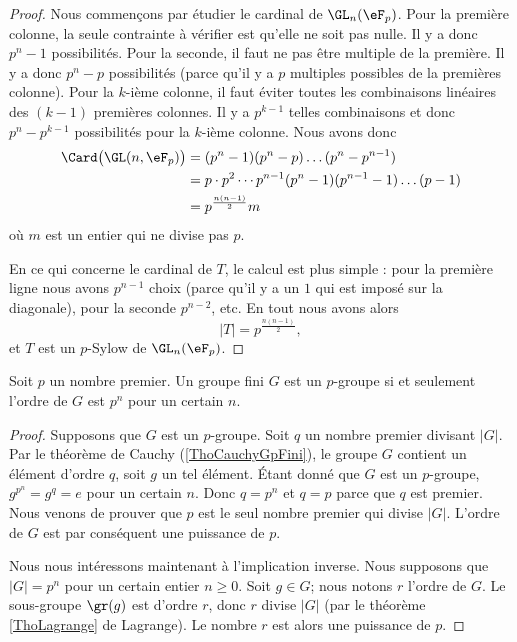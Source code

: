 \begin{proof}
    Nous commençons par étudier le cardinal de \( \GL_n(\eF_p)\). Pour la première colonne, la seule contrainte à vérifier est qu'elle ne soit pas nulle. Il y a donc \( p^n-1\) possibilités. Pour la seconde, il faut ne pas être multiple de la première. Il y a donc \( p^n-p\) possibilités (parce qu'il y a \( p\) multiples possibles de la premières colonne). Pour la \( k\)-ième colonne, il faut éviter toutes les combinaisons linéaires des \( (k-1)\) premières colonnes. Il y a \( p^{k-1}\) telles combinaisons et donc \( p^n-p^{k-1}\) possibilités pour la \( k\)-ième colonne. Nous avons donc
    \begin{subequations}
        \begin{align}
            \Card\big( \GL(n,\eF_{p}) \big)&=(p^n-1)(p^n-p)\ldots(p^n-p^{n-1})\\
            &=p\cdot p^2\cdots p^{n-1}(p^n-1)(p^{n-1}-1)\ldots (p-1)\\
            &=p^{\frac{ n(n-1) }{2}}m
        \end{align}
    \end{subequations}
    où \( m\) est un entier qui ne divise pas \( p\).

    En ce qui concerne le cardinal de \( T\), le calcul est plus simple : pour la première ligne nous avons \( p^{n-1}\) choix (parce qu'il y a un \( 1\) qui est imposé sur la diagonale), pour la seconde \( p^{n-2}\), etc. En tout nous avons alors
    \begin{equation}
        | T |=p^{\frac{ n(n-1) }{2}},
    \end{equation}
    et \( T\) est un \( p\)-Sylow de \( \GL_n(\eF_p)\).
\end{proof}


\begin{proposition}
    Soit \( p\) un nombre premier. Un groupe fini \( G\) est un $p$-groupe si et seulement l'ordre de \( G\) est \( p^n\) pour un certain \( n\).
\end{proposition}

\begin{proof}
    Supposons que \( G\) est un $p$-groupe. Soit \( q\) un nombre premier divisant \( | G |\). Par le théorème de Cauchy (\ref{ThoCauchyGpFini}), le groupe \( G\) contient un élément d'ordre \( q\), soit \( g\) un tel élément. Étant donné que \( G\) est un $p$-groupe, \( g^{p^n}=g^q=e\) pour un certain \( n\). Donc $q=p^n$ et \( q=p\) parce que \( q\) est premier. Nous venons de prouver que \( p\) est le seul nombre premier qui divise \( | G |\). L'ordre de \( G\) est par conséquent une puissance de \( p\).

    Nous nous intéressons maintenant à l'implication inverse. Nous supposons que \( | G |=p^n\) pour un certain entier \( n\geq 0\). Soit \( g\in G\); nous notons \( r\) l'ordre de \( G\). Le sous-groupe \( \gr(g)\) est d'ordre \( r\), donc \( r\) divise \( | G |\) (par le théorème \ref{ThoLagrange} de Lagrange). Le nombre \( r\) est alors une puissance de \( p\).
\end{proof}

